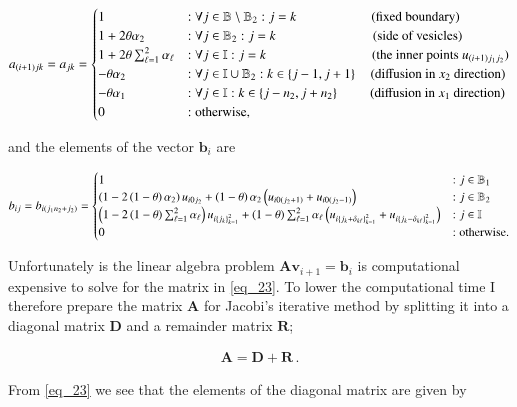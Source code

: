\documentclass[11pt,english,a4paper]{article}
\begin{document}
\begin{flushleft}
\begin{align}
a_{(i+1)jk} = a_{jk} = \begin{cases} 
1 &:\forall j\in\mathbb{B}\setminus\mathbb{B}_2  : j=k \,\,\,\,\quad\qquad\qquad \text{(fixed boundary)}\\
1+ 2\theta \alpha_2 &: \forall j\in\mathbb{B}_2: j=k \,\,\quad\qquad\qquad\qquad (\text{side of vesicles}) \\ 
1+ 2\theta \sum_{\ell = 1}^2 \alpha_\ell &: \forall j\in\mathbb{I}: j=k \qquad\qquad\qquad\qquad (\text{the inner points }u_{(i+1)j_1j_2}) \\ 
-\theta \alpha_2 &: \forall j\in\mathbb{I}\cup\mathbb{B}_2: k\in\left\lbrace{j-1,j+1}\right\rbrace\quad \text{(diffusion in $x_2$ direction)} \\ 
- \theta \alpha_1 &: \forall j\in\mathbb{I} : k \in \left\lbrace{j-n_2,j+n_2}\right\rbrace \,\,\qquad\text{(diffusion in $x_1$ direction)} \\
 0 & : \text{otherwise,} \end{cases}
\label{eq_23}
\end{align}

and the elements of the vector $\textbf{b}_i$ are

\begin{align}
b_{ij} = b_{i(j_1 n_2 + j_2)} = \begin{cases}
1 &: j\in\mathbb{B}_1 \\
\left({1-2\left({1-\theta}\right)\alpha_2}\right) u_{i0j_2} + \left({1-\theta}\right)\alpha_2\left({u_{i0(j_2+1)} + u_{i0(j_2-1)}}\right) &: j\in\mathbb{B}_2 \\
\left({1-2\left({1-\theta}\right)\sum_{\ell = 1}^2 \alpha_\ell}\right) u_{i\left\lbrace{j_k}\right\rbrace_{k=1}^2} + \left({1-\theta}\right)\sum_{\ell=1}^2\alpha_\ell\left({u_{i\left\lbrace{j_k+\delta_{k\ell}}\right\rbrace_{k=1}^2} + u_{i\left\lbrace{j_k-\delta_{k\ell}}\right\rbrace_{k=1}^2}}\right) &: j\in\mathbb{I} \\
0 &: \text{otherwise.}
\end{cases}
\label{eq_24}
\end{align}

Unfortunately  is the linear algebra problem $\textbf{A}\textbf{v}_{i+1} = \textbf{b}_i$ is computational expensive to solve for the matrix in \eqref{eq_23}. To lower the computational time I therefore prepare the matrix $\textbf{A}$ for Jacobi's iterative method by splitting it into a diagonal matrix $\textbf{D}$ and a remainder matrix $\textbf{R}$;

\begin{align*}
\textbf{A} = \textbf{D} + \textbf{R} \,.
\end{align*}

From \eqref{eq_23} we see that the elements of the diagonal matrix are given by


\end{flushleft}
\end{document}
